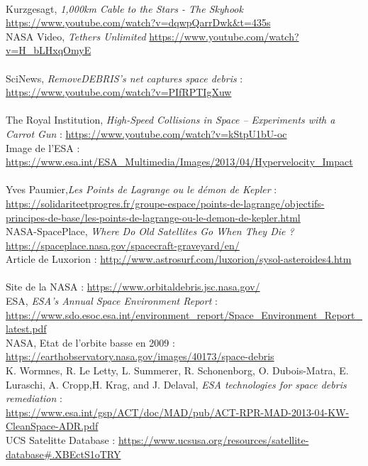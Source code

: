 \documentclass[a4paper,1pt]{article}
\begin{document}
\begin{thebibliography}{11}
~\\
		Kurzgesagt, \textit{1,000km Cable to the Stars - The Skyhook}
		\url{https://www.youtube.com/watch?v=dqwpQarrDwk&t=435s}\\

		NASA Video, \textit{Tethers Unlimited}
		\url{https://www.youtube.com/watch?v=H_bLHxqOmyE}\\
		
~\\
		SciNews, \textit{RemoveDEBRIS's net captures space debris} : 
		\url{https://www.youtube.com/watch?v=PIfRPTIgXuw}\\

~\\
		The Royal Institution, \textit{High-Speed Collisions in Space – Experiments with a Carrot Gun} : 			\url{https://www.youtube.com/watch?v=kStpU1bU-oc}\\
		
		Image de l'ESA : \url{https://www.esa.int/ESA_Multimedia/Images/2013/04/Hypervelocity_Impact}\\
		
~\\
		Yves Paumier,\textit{Les Points de Lagrange ou le démon de Kepler} : 
		\url{https://solidariteetprogres.fr/groupe-espace/points-de-lagrange/objectifs-principes-de-base/les-points-de-lagrange-ou-le-demon-de-kepler.html}\\
		
		NASA-SpacePlace, \textit{Where Do Old Satellites Go When They Die ?}
		\url{https://spaceplace.nasa.gov/spacecraft-graveyard/en/}\\
		
		Article de Luxorion : \url{http://www.astrosurf.com/luxorion/sysol-asteroides4.htm}\\

~\\
	Site de la NASA : \url{https://www.orbitaldebris.jsc.nasa.gov/}\\
	
	ESA, \textit{ESA's Annual Space Environment Report} : \url{https://www.sdo.esoc.esa.int/environment_report/Space_Environment_Report_latest.pdf}\\
	
	NASA, Etat de l'orbite basse en 2009 : \url{https://earthobservatory.nasa.gov/images/40173/space-debris}\\
	
	K. Wormnes, R. Le Letty, L. Summerer, R. Schonenborg, O. Dubois-Matra, E. Luraschi, A. Cropp,H. Krag, and J. Delaval, \textit{ESA technologies for space debris remediation} :\\
	\url{https://www.esa.int/gsp/ACT/doc/MAD/pub/ACT-RPR-MAD-2013-04-KW-CleanSpace-ADR.pdf}\\
	
	UCS Satelitte Database : \url{https://www.ucsusa.org/resources/satellite-database#.XBEctS1oTRY}\\

\end{thebibliography}
\end{document}
